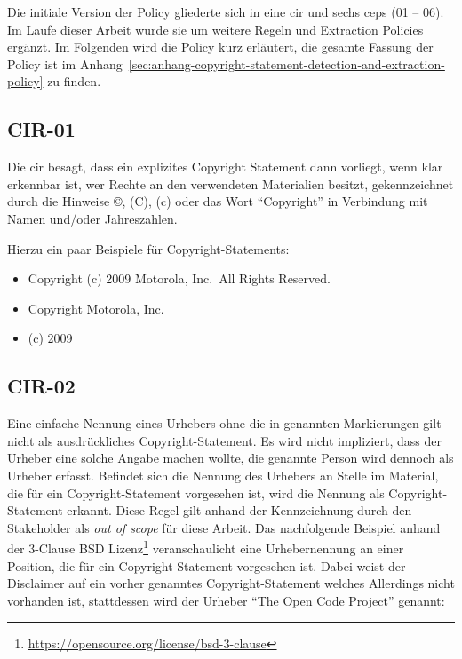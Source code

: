 Die initiale Version der Policy gliederte sich in eine \gls{cir} und sechs \glspl{cep} (01 -- 06).
Im Laufe dieser Arbeit wurde sie um weitere Regeln und Extraction Policies ergänzt.
Im Folgenden wird die Policy kurz erläutert, die gesamte Fassung der Policy ist im Anhang~\ref{sec:anhang-copyright-statement-detection-and-extraction-policy} zu finden.


\subsection{CIR-01}\label{subsec:cir-01}

Die \gls{cir} besagt, dass ein explizites Copyright Statement dann vorliegt, wenn klar erkennbar ist, wer Rechte an den verwendeten Materialien besitzt, gekennzeichnet durch die Hinweise ©, (C), (c) oder das Wort \enquote{Copyright} in Verbindung mit Namen und/oder Jahreszahlen.

Hierzu ein paar Beispiele für Copyright-Statements:
\begin{itemize}
    \item Copyright (c) 2009 Motorola, Inc.\ All Rights Reserved.
    \item Copyright Motorola, Inc.
    \item (c) 2009
\end{itemize}


\subsection{CIR-02}\label{subsec:cir-02}

Eine einfache Nennung eines Urhebers ohne die in  genannten Markierungen gilt nicht als ausdrückliches Copyright-Statement.
Es wird nicht impliziert, dass der Urheber eine solche Angabe machen wollte, die genannte Person wird dennoch als Urheber erfasst.
Befindet sich die Nennung des Urhebers an Stelle im Material, die für ein Copyright-Statement vorgesehen ist, wird die Nennung als Copyright-Statement erkannt.
Diese Regel gilt anhand der Kennzeichnung durch den Stakeholder als \textit{out of scope} für diese Arbeit.
Das nachfolgende Beispiel anhand der 3-Clause BSD Lizenz\footnote{\url{https://opensource.org/license/bsd-3-clause}} veranschaulicht eine Urhebernennung an einer Position, die für ein Copyright-Statement vorgesehen ist.
Dabei weist der Disclaimer auf ein vorher genanntes Copyright-Statement welches Allerdings nicht vorhanden ist, stattdessen wird der Urheber \enquote{The Open Code Project} genannt:

